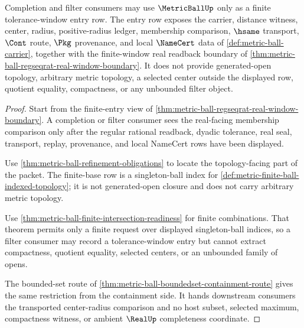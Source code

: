 \begin{theorem}
\label{thm:metric-ball-cauchy-filter-entry-boundary}
Completion and filter consumers may use $\MetricBallUp$ only as a finite tolerance-window entry row. The entry row exposes the carrier, distance witness, center, radius, positive-radius ledger, membership comparison, $\hsame$ transport, $\Cont$ route, $\Pkg$ provenance, and local $\NameCert$ data of \autoref{def:metric-ball-carrier}, together with the finite-window real readback boundary of \autoref{thm:metric-ball-regseqrat-real-window-boundary}. It does not provide generated-open topology, arbitrary metric topology, a selected center outside the displayed row, quotient equality, compactness, or any unbounded filter object.
\end{theorem}
\begin{proof}
Start from the finite-entry view of \autoref{thm:metric-ball-regseqrat-real-window-boundary}. A completion or filter consumer sees the real-facing membership comparison only after the regular rational readback, dyadic tolerance, real seal, transport, replay, provenance, and local NameCert rows have been displayed.

Use \autoref{thm:metric-ball-refinement-obligations} to locate the topology-facing part of the packet. The finite-base row is a singleton-ball index for \autoref{def:metric-finite-ball-indexed-topology}; it is not generated-open closure and does not carry arbitrary metric topology.

Use \autoref{thm:metric-ball-finite-intersection-readiness} for finite combinations. That theorem permits only a finite request over displayed singleton-ball indices, so a filter consumer may record a tolerance-window entry but cannot extract compactness, quotient equality, selected centers, or an unbounded family of opens.

The bounded-set route of \autoref{thm:metric-ball-boundedset-containment-route} gives the same restriction from the containment side. It hands downstream consumers the transported center-radius comparison and no host subset, selected maximum, compactness witness, or ambient $\RealUp$ completeness coordinate.
\end{proof}

